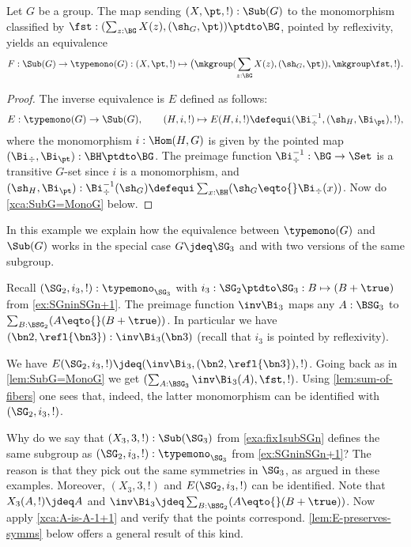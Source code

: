 \begin{lemma}\label{lem:SubG=MonoG}
  Let $G$ be a group.
  The map sending $(X,\pt,!) : \Sub(G)$ to the monomorphism classified by  
  $\fst: (\sum_{z:\BG}X(z),(\sh_G,\pt))\ptdto\BG$, pointed by
  reflexivity, yields an equivalence
\[
F: \Sub(G)\to \typemono(G) : (X,\pt,!) \mapsto \bigl(\mkgroup (\sum_{z:\BG}X(z),(\sh_G,\pt)),\mkgroup\fst,!\bigr).\qedhere
\]
\end{lemma}

\begin{proof}
   The inverse equivalence is $E$ defined as follows:
 $$E:\typemono(G)\to\Sub(G),\qquad 
   (H,i,!)\mapsto E(H,i,!)\defequi (\Bi_\div^{-1},(\sh_H,\Bi_\pt),!),$$
  where the monomorphism $i:\Hom(H,G)$ is given by 
  the pointed map $(\Bi_\div,\Bi_\pt):\BH\ptdto\BG$.
  The preimage function $\Bi_\div^{-1}:\BG\to\Set$ is a transitive $G$-set 
  since $i$ is a monomorphism, and $(\sh_H,\Bi_\pt):\Bi_\div^{-1}(\sh_G)
  \defequi \sum_{x:\BH}(\sh_G\eqto{}\Bi_\div(x))$.
  Now do \cref{xca:SubG=MonoG} below.
\end{proof}

 \begin{example}\label{exa:EforSG3}
  In this example we explain how the equivalence between
  $\typemono(G)$ and $\Sub(G)$ works in the special case
  $G\jdeq\SG_3$ and with two versions of the same subgroup.
  
  Recall $(\SG_2,i_3,!):\typemono_{\SG_3}$ with
  $i_3: \SG_2\ptdto\SG_3 : B\mapsto (B+\true)$ from \cref{ex:SGninSGn+1}.
  The preimage function $\inv\Bi_3$ maps any $A:\BSG_3$
  to $\sum_{B:\BSG_2}(A\eqto{}(B+\true))$.
  In particular we have $(\bn2,\refl{\bn3}):\inv\Bi_3(\bn3)$
  (recall that $i_3$ is pointed by reflexivity).
   
  We have $E(\SG_2,i_3,!)\jdeq(\inv\Bi_3,(\bn2,\refl{\bn3}),!)$.
  Going back as in \cref{lem:SubG=MonoG} we get 
  $(\sum_{A:\BSG_3}\inv\Bi_3(A),\fst,!)$. Using \cref{lem:sum-of-fibers}
  one sees that, indeed, the latter monomorphism 
  can be identified with $(\SG_2,i_3,!)$.
  
  Why do we say that $(X_3,3,!):\Sub(\SG_3)$ from \cref{exa:fix1subSGn}
  defines the same subgroup as $(\SG_2,i_3,!):\typemono_{\SG_3}$
  from \cref{ex:SGninSGn+1}? The reason is that they pick out
  the same symmetries in $\SG_3$, as argued in these examples.
  Moreover, $(X_3,3,!)$ and $E(\SG_2,i_3,!)$ can be identified.
  Note that $X_3(A,!) \jdeq A$ and 
  $\inv\Bi_3 \jdeq \sum_{B:\BSG_2}(A\eqto{}(B+\true))$.
  Now apply \cref{xca:A-is-A-1+1} and verify that the points correspond.
  \cref{lem:E-preserves-symms} below offers a general result of this kind.
  \end{example}


